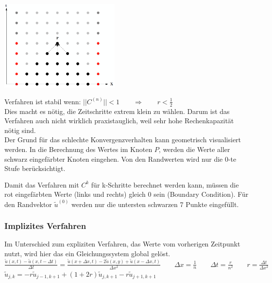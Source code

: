 \begin{minipage}{6cm}
\includegraphics[width=6cm]{Content/02_numerics/KonvExplizit.png}
\end{minipage}
\hfill
\begin{minipage}{12cm}
Verfahren ist stabil wenn: $||C^{(n)}|| < 1 \qquad \Rightarrow\qquad r < \frac{1}{2}$\\

Dies macht es nötig, die Zeitschritte extrem klein zu wählen. Darum ist das Verfahren auch nicht wirklich praxistauglich, weil sehr hohe Rechenkapazität nötig sind.\\

Der Grund für das schlechte Konvergenzverhalten kann geometrisch visualisiert werden. In die Berechnung des Wertes im Knoten $P$, werden die Werte aller schwarz eingefärbter Knoten eingehen. Von den Randwerten wird nur die 0-te Stufe berücksichtigt.
\end{minipage}
Damit das Verfahren mit $C^k$ für k-Schritte berechnet werden kann, müssen die
rot eingefärbten Werte (links und rechts) gleich 0 sein (Boundary Condition).
Für den Randvektor $\tilde{u}^{(0)}$ werden nur die untersten schwarzen 7 Punkte
eingefüllt.

\subsubsection{Implizites Verfahren}
Im Unterschied zum expliziten Verfahren, das Werte vom vorherigen Zeitpunkt nutzt, wird hier das ein Gleichungssystem global gelöst.\\

$\boxed{\frac{\tilde{u}(x,t) - \tilde{u}(x,t -\Delta t)}{\Delta t} =
\frac{\tilde{u}(x+\Delta x, t)-2\tilde{u}(x,y) + \tilde{u}( x - \Delta x, t )} {\Delta x^2}}
 \qquad \Delta x=\frac{1}{n} \qquad \Delta t=\frac{r}{n^2} \qquad \boxed{r=\frac{\Delta
t}{\Delta x^2}}$\\

$ \tilde{u}_{j,k} = - r \tilde{u}_{j-1,k+1} + (1+2r)\tilde{u}_{j,k+1} - r \tilde{u}_{j+1,k+1}$

